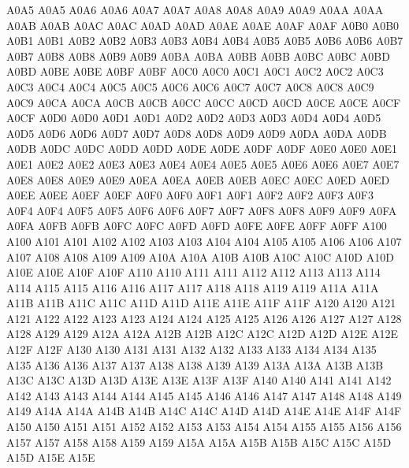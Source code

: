 \ID A0A5 A0A5
\ID A0A6 A0A6
\ID A0A7 A0A7
\ID A0A8 A0A8
\ID A0A9 A0A9
\ID A0AA A0AA
\ID A0AB A0AB
\ID A0AC A0AC
\ID A0AD A0AD
\ID A0AE A0AE
\ID A0AF A0AF
\ID A0B0 A0B0
\ID A0B1 A0B1
\ID A0B2 A0B2
\ID A0B3 A0B3
\ID A0B4 A0B4
\ID A0B5 A0B5
\ID A0B6 A0B6
\ID A0B7 A0B7
\ID A0B8 A0B8
\ID A0B9 A0B9
\ID A0BA A0BA
\ID A0BB A0BB
\ID A0BC A0BC
\ID A0BD A0BD
\ID A0BE A0BE
\ID A0BF A0BF
\ID A0C0 A0C0
\ID A0C1 A0C1
\ID A0C2 A0C2
\ID A0C3 A0C3
\ID A0C4 A0C4
\ID A0C5 A0C5
\ID A0C6 A0C6
\ID A0C7 A0C7
\ID A0C8 A0C8
\ID A0C9 A0C9
\ID A0CA A0CA
\ID A0CB A0CB
\ID A0CC A0CC
\ID A0CD A0CD
\ID A0CE A0CE
\ID A0CF A0CF
\ID A0D0 A0D0
\ID A0D1 A0D1
\ID A0D2 A0D2
\ID A0D3 A0D3
\ID A0D4 A0D4
\ID A0D5 A0D5
\ID A0D6 A0D6
\ID A0D7 A0D7
\ID A0D8 A0D8
\ID A0D9 A0D9
\ID A0DA A0DA
\ID A0DB A0DB
\ID A0DC A0DC
\ID A0DD A0DD
\ID A0DE A0DE
\ID A0DF A0DF
\ID A0E0 A0E0
\ID A0E1 A0E1
\ID A0E2 A0E2
\ID A0E3 A0E3
\ID A0E4 A0E4
\ID A0E5 A0E5
\ID A0E6 A0E6
\ID A0E7 A0E7
\ID A0E8 A0E8
\ID A0E9 A0E9
\ID A0EA A0EA
\ID A0EB A0EB
\ID A0EC A0EC
\ID A0ED A0ED
\ID A0EE A0EE
\ID A0EF A0EF
\ID A0F0 A0F0
\ID A0F1 A0F1
\ID A0F2 A0F2
\ID A0F3 A0F3
\ID A0F4 A0F4
\ID A0F5 A0F5
\ID A0F6 A0F6
\ID A0F7 A0F7
\ID A0F8 A0F8
\ID A0F9 A0F9
\ID A0FA A0FA
\ID A0FB A0FB
\ID A0FC A0FC
\ID A0FD A0FD
\ID A0FE A0FE
\ID A0FF A0FF
\ID A100 A100
\ID A101 A101
\ID A102 A102
\ID A103 A103
\ID A104 A104
\ID A105 A105
\ID A106 A106
\ID A107 A107
\ID A108 A108
\ID A109 A109
\ID A10A A10A
\ID A10B A10B
\ID A10C A10C
\ID A10D A10D
\ID A10E A10E
\ID A10F A10F
\ID A110 A110
\ID A111 A111
\ID A112 A112
\ID A113 A113
\ID A114 A114
\ID A115 A115
\ID A116 A116
\ID A117 A117
\ID A118 A118
\ID A119 A119
\ID A11A A11A
\ID A11B A11B
\ID A11C A11C
\ID A11D A11D
\ID A11E A11E
\ID A11F A11F
\ID A120 A120
\ID A121 A121
\ID A122 A122
\ID A123 A123
\ID A124 A124
\ID A125 A125
\ID A126 A126
\ID A127 A127
\ID A128 A128
\ID A129 A129
\ID A12A A12A
\ID A12B A12B
\ID A12C A12C
\ID A12D A12D
\ID A12E A12E
\ID A12F A12F
\ID A130 A130
\ID A131 A131
\ID A132 A132
\ID A133 A133
\ID A134 A134
\ID A135 A135
\ID A136 A136
\ID A137 A137
\ID A138 A138
\ID A139 A139
\ID A13A A13A
\ID A13B A13B
\ID A13C A13C
\ID A13D A13D
\ID A13E A13E
\ID A13F A13F
\ID A140 A140
\ID A141 A141
\ID A142 A142
\ID A143 A143
\ID A144 A144
\ID A145 A145
\ID A146 A146
\ID A147 A147
\ID A148 A148
\ID A149 A149
\ID A14A A14A
\ID A14B A14B
\ID A14C A14C
\ID A14D A14D
\ID A14E A14E
\ID A14F A14F
\ID A150 A150
\ID A151 A151
\ID A152 A152
\ID A153 A153
\ID A154 A154
\ID A155 A155
\ID A156 A156
\ID A157 A157
\ID A158 A158
\ID A159 A159
\ID A15A A15A
\ID A15B A15B
\ID A15C A15C
\ID A15D A15D
\ID A15E A15E

